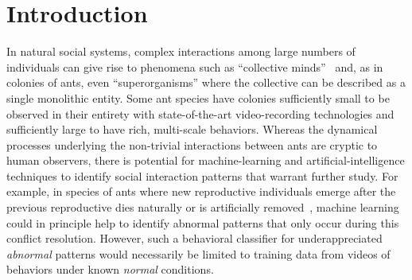 \documentclass[letterpaper]{article} %
\begin{document}
\section{Introduction}
\label{sec:intro}

\noindent In natural social systems, complex interactions among large
numbers of individuals can give rise to phenomena such as ``collective
minds''~\citep{C07} and, as in colonies of ants, even ``superorganisms''
where the collective can be described as a single monolithic entity.
Some ant species have colonies sufficiently small to be observed
in their entirety with state-of-the-art video-recording technologies
and sufficiently large to have rich, multi-scale behaviors. Whereas
the dynamical processes underlying the non-trivial interactions between ants
are cryptic to human observers, there is potential for
machine-learning and artificial-intelligence techniques to identify social
interaction patterns that warrant further study. For example, in species
of ants where new reproductive individuals emerge after
the previous reproductive dies naturally or is artificially
removed~\citep{HHP94, SPSHPL16}, machine learning could in principle
help to identify abnormal patterns that only occur during this conflict
resolution. However, such a behavioral
classifier for underappreciated \emph{abnormal} patterns would
necessarily be limited to training data from videos of behaviors under
known \emph{normal} conditions.
\end{document}
